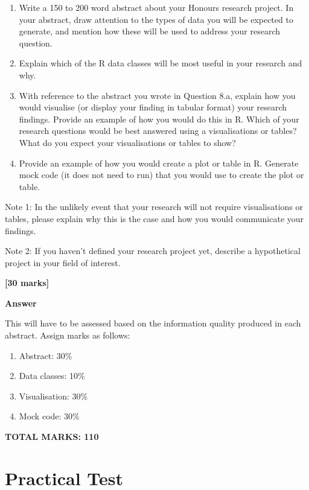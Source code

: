 \documentclass[
  10t,
]{article}
\providecommand{\tightlist}{%
  \setlength{\itemsep}{0pt}\setlength{\parskip}{0pt}}\usepackage{longtable,booktabs,array}
\begin{document}
\begin{enumerate}
\def\labelenumi{\alph{enumi}.}
\item
  Write a 150 to 200 word abstract about your Honours research project.
  In your abstract, draw attention to the types of data you will be
  expected to generate, and mention how these will be used to address
  your research question.
\item
  Explain which of the R data classes will be most useful in your
  research and why.
\item
  With reference to the abstract you wrote in Question 8.a, explain how
  you would visualise (or display your finding in tabular format) your
  research findings. Provide an example of how you would do this in R.
  Which of your research questions would be best answered using a
  visualisations or tables? What do you expect your visualisations or
  tables to show?
\item
  Provide an example of how you would create a plot or table in R.
  Generate mock code (it does not need to run) that you would use to
  create the plot or table.
\end{enumerate}

Note 1: In the unlikely event that your research will not require
visualisations or tables, please explain why this is the case and how
you would communicate your findings.

Note 2: If you haven't defined your research project yet, describe a
hypothetical project in your field of interest.

\textbf{{[}30 marks{]}}

\textbf{Answer}

This will have to be assessed based on the information quality produced
in each abstract. Assign marks as follows:

\begin{enumerate}
\def\labelenumi{\alph{enumi}.}
\tightlist
\item
  Abstract: 30\%
\item
  Data classes: 10\%
\item
  Visualisation: 30\%
\item
  Mock code: 30\%
\end{enumerate}

\textbf{TOTAL MARKS: 110}

\section{Practical Test}\label{practical-test}
\end{document}
